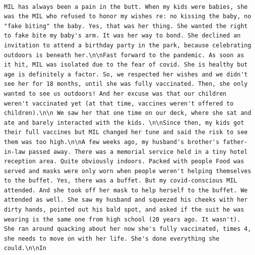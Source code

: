 \documentclass[
  letterpaper,
  DIV=11,
  numbers=noendperiod]{scrreprt}
\begin{document}
\begin{verbatim}
                                                                                                                                                                                                                                                                                                                                                                                                                                                                                                                                                                                                                                                                                                                                                                                                                                                                                                                                                                                                                                                                                                                                                                                                                                                                                                                                                                                                                                                                                                                                                                                                                                           MIL has always been a pain in the butt. When my kids were babies, she was the MIL who refused to honor my wishes re: no kissing the baby, no "fake biting" the baby. Yes, that was her thing. She wanted the right to fake bite my baby's arm. It was her way to bond. She declined an invitation to attend a birthday party in the park, because celebrating outdoors is beneath her.\n\nFast forward to the pandemic. As soon as it hit, MIL was isolated due to the fear of covid. She is healthy but age is definitely a factor. So, we respected her wishes and we didn't see her for 18 months, until she was fully vaccinated. Then, she only wanted to see us outdoors! And her excuse was that our children weren't vaccinated yet (at that time, vaccines weren't offered to children).\n\n We saw her that one time on our deck, where she sat and ate and barely interacted with the kids. \n\nSince then, my kids got their full vaccines but MIL changed her tune and said the risk to see them was too high.\n\nA few weeks ago, my husband's brother's father-in-law passed away. There was a memorial service held in a tiny hotel reception area. Quite obviously indoors. Packed with people Food was served and masks were only worn when people weren't helping themselves to the buffet. Yes, there was a buffet. But my covid-conscious MIL attended. And she took off her mask to help herself to the buffet. We attended as well. She saw my husband and squeezed his cheeks with her dirty hands, pointed out his bald spot, and asked if the suit he was wearing is the same one from high school (20 years ago. It wasn't). She ran around quacking about her now she's fully vaccinated, times 4, she needs to move on with her life. She's done everything she could.\n\nIn 
\end{verbatim}
\end{document}
